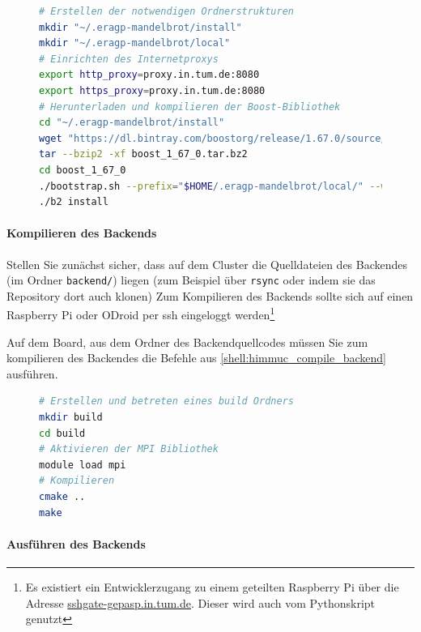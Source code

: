 \begin{figure}[h!]
    \begin{lstlisting}[language=bash, caption={Lokale Installation der Bibliothek boost.}, label={shell:install_boost}]
# Erstellen der notwendigen Ordnerstrukturen
mkdir "~/.eragp-mandelbrot/install"
mkdir "~/.eragp-mandelbrot/local"
# Einrichten des Internetproxys
export http_proxy=proxy.in.tum.de:8080
export https_proxy=proxy.in.tum.de:8080
# Herunterladen und kompilieren der Boost-Bibliothek
cd "~/.eragp-mandelbrot/install"
wget "https://dl.bintray.com/boostorg/release/1.67.0/source/boost_1_67_0.tar.bz2"
tar --bzip2 -xf boost_1_67_0.tar.bz2
cd boost_1_67_0
./bootstrap.sh --prefix="$HOME/.eragp-mandelbrot/local/" --with-libraries=system
./b2 install
    \end{lstlisting}
\end{figure}

\paragraph{Kompilieren des Backends}\label{par:himmuc_build_backend}

Stellen Sie zunächst sicher, dass auf dem Cluster die Quelldateien des Backendes (im Ordner \verb|backend/|) liegen
(zum Beispiel über \verb|rsync| oder indem sie das Repository dort auch klonen)
Zum Kompilieren des Backends sollte sich auf einen Raspberry Pi oder ODroid
per ssh eingeloggt werden\footnote{Es existiert ein Entwicklerzugang zu einem geteilten Raspberry Pi über die Adresse \url{sshgate-gepasp.in.tum.de}. Dieser wird auch vom Pythonskript genutzt}

Auf dem Board, aus dem Ordner des Backendquellcodes müssen Sie zum kompilieren
des Backendes die Befehle aus \autoref{shell:himmuc_compile_backend} ausführen.

\begin{figure}[h!]
	\begin{lstlisting}[language=bash, caption={Kompilieren des Backends}, label={shell:himmuc_compile_backend}]
# Erstellen und betreten eines build Ordners
mkdir build
cd build
# Aktivieren der MPI Bibliothek
module load mpi
# Kompilieren
cmake ..
make
    \end{lstlisting}
\end{figure}


\paragraph{Ausführen des Backends}\label{par:himmuc_run_backend}

